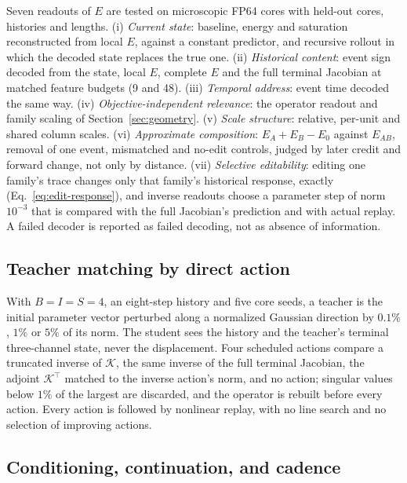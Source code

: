 \documentclass[11pt]{article}
\theoremstyle{definition}
\begin{document}
Seven readouts of $E$ are tested on microscopic FP64 cores with held-out cores,
histories and lengths. (i) \emph{Current state}: baseline, energy and saturation
reconstructed from local $E$, against a constant predictor, and recursive rollout
in which the decoded state replaces the true one. (ii) \emph{Historical content}:
event sign decoded from the state, local $E$, complete $E$ and the full terminal
Jacobian at matched feature budgets (9 and 48). (iii) \emph{Temporal address}:
event time decoded the same way. (iv) \emph{Objective-independent relevance}: the
operator readout and family scaling of Section~\ref{sec:geometry}. (v) \emph{Scale
structure}: relative, per-unit and shared column scales. (vi) \emph{Approximate
composition}: $E_A+E_B-E_0$ against $E_{AB}$, removal of one event, mismatched and
no-edit controls, judged by later credit and forward change, not only by distance.
(vii) \emph{Selective editability}: editing one family's trace changes only that
family's historical response, exactly (Eq.~\eqref{eq:edit-response}), and inverse
readouts choose a parameter step of norm $10^{-3}$ that is compared with the full
Jacobian's prediction and with actual replay. A failed decoder is reported as failed decoding, not as absence of
information.

\subsection{Teacher matching by direct action}

With $B=I=S=4$, an eight-step history and five core seeds, a teacher is the
initial parameter vector perturbed along a normalized Gaussian direction by
$0.1\%$, $1\%$ or $5\%$ of its norm. The student sees the history and the teacher's
terminal three-channel state, never the displacement. Four scheduled actions
compare a truncated inverse of $\mathcal K$, the same inverse of the full terminal
Jacobian, the adjoint $\mathcal K^\top$ matched to the inverse action's norm, and no
action; singular values below $1\%$ of the largest are discarded, and the operator
is rebuilt before every action. Every action is followed by nonlinear replay, with
no line search and no selection of improving actions.

\subsection{Conditioning, continuation, and cadence}
\label{sec:cadence}
\end{document}
